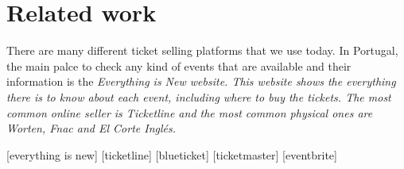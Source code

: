 \section{Related work}

There are many different ticket selling platforms that we use today. In Portugal, the main palce to check any kind of events that are available and their information is the \it{Everything is New} website. This website shows the everything there is to know about each event, including where to buy the tickets. The most common online seller is \it{Ticketline} and the most common physical ones are \it{Worten}, \it{Fnac} and \it{El Corte Inglés}.

[everything is new]
[ticketline]
[blueticket]
[ticketmaster]
[eventbrite]